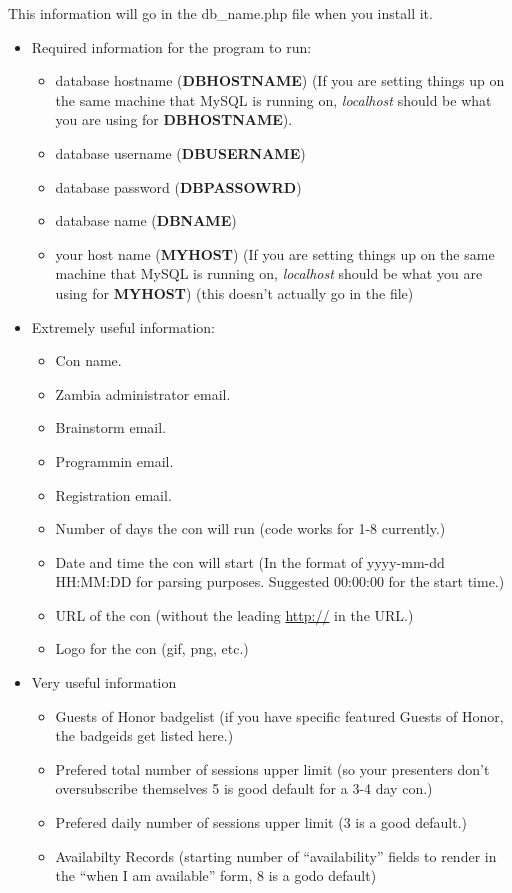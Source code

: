 \documentclass[tablesignature]{scrartcl}
\begin{document}
    This information will go in the db\_{}name.php file when you install it.
\begin{itemize}

\item Required information for the program to run:
\label{sec-1_2_3_1}%
\begin{itemize}
\item database hostname (\textbf{DBHOSTNAME}) (If you are setting things up on
     the same machine that MySQL is running on, \emph{localhost} should be
     what you are using for \textbf{DBHOSTNAME}).
\item database username (\textbf{DBUSERNAME})
\item database password (\textbf{DBPASSOWRD})
\item database name (\textbf{DBNAME})
\item your host name (\textbf{MYHOST}) (If you are setting things up on the same
     machine that MySQL is running on, \emph{localhost} should be what you
     are using for \textbf{MYHOST}) (this doesn't actually go in the file)
\end{itemize}


\item Extremely useful information:
\label{sec-1_2_3_2}%
\begin{itemize}
\item Con name.
\item Zambia administrator email.
\item Brainstorm email.
\item Programmin email.
\item Registration email.
\item Number of days the con will run (code works for 1-8 currently.)
\item Date and time the con will start (In the format of yyyy-mm-dd HH:MM:DD for parsing purposes.  Suggested 00:00:00 for the start time.)
\item URL of the con (without the leading \href{http://}{http://} in the URL.)
\item Logo for the con (gif, png, etc.)
\end{itemize}


\item Very useful information
\label{sec-1_2_3_3}%
\begin{itemize}
\item Guests of Honor badgelist (if you have specific featured Guests of Honor, the badgeids get listed here.)
\item Prefered total number of sessions upper limit (so your presenters don't oversubscribe themselves 5 is good default for a 3-4 day con.)
\item Prefered daily number of sessions upper limit (3 is a good default.)
\item Availabilty Records (starting number of ``availability'' fields to render in the ``when I am available'' form, 8 is a godo default)
\end{itemize}



\end{itemize}
\end{document}
